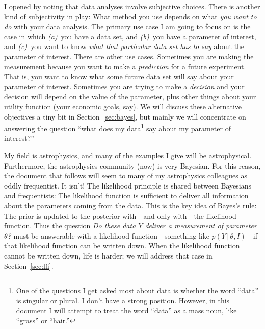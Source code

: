 \documentclass{article}
\newcommand{\sectionname}{Section}
\newcommand{\secref}[1]{\sectionname~\ref{#1}}
\newcommand{\given}{\,|\,}
\begin{document}
I opened by noting that data analyses involve subjective choices.
There is another kind of subjectivity in play:
What method you use depends on what \emph{you want to do} with your data analysis.
The primary use case I am going to focus on is the case in which
\textsl{(a)}~you have a data set, and
\textsl{(b)}~you have a parameter of interest,
and \textsl{(c)}~you want to know \emph{what that particular data set has to say} about the parameter of interest.
There are other use cases.
Sometimes you are making the measurement because you want to make a \emph{prediction} for a future experiment.
That is, you want to know what some future data set will say about your parameter of interest.
Sometimes you are trying to make a \emph{decision} and your decision will depend on the value of the parameter, plus other things about your utility function (your economic goals, say).
We will discuss these alternative objectives a tiny bit in \secref{sec:bayes}, but mainly we will concentrate on answering the question ``what does my data\footnote{%
One of the questions I get asked most about data is whether the word ``data'' is singular or plural. I don't have a strong position. However, in this document I will attempt to treat the word ``data'' as a mass noun, like ``grass'' or ``hair.''}
say about my parameter of interest?''

My field is astrophysics, and many of the examples I give will be astrophysical.
Furthermore, the astrophysics community (now) is very Bayesian.
For this reason, the document that follows will seem to many of my astrophysics colleagues as oddly frequentist.
It isn't!
The likelihood principle is shared between Bayesians and frequentists:
The likelihood function is sufficient to deliver all information about the parameters coming from the data.
This is the key idea of Bayes's rule:
The prior is updated to the posterior with---and only with---the likelihood function.
Thus the question \emph{Do these data $Y$ deliver a measurement of parameter $\theta$?} must be answerable with a likelihood function---something like $p(Y\given\theta,I)$---if that likelihood function can be written down.
When the likelihood function cannot be written down, life is harder; we will address that case in \secref{sec:lfi}.
\end{document}

